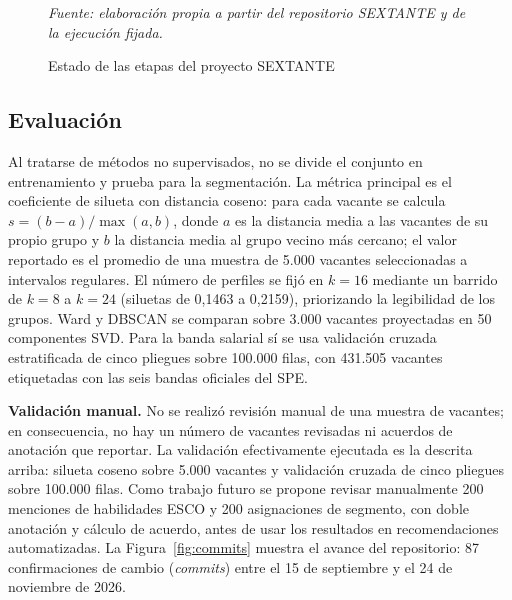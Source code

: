 \documentclass[journal]{IEEEtran}
\begin{document}
\begin{figure}[H]
\centering
{}
\caption{Estado de las etapas del proyecto SEXTANTE}
\label{fig:etapas}
\vspace{1pt}
{\footnotesize\textit{Fuente: elaboración propia a partir del repositorio SEXTANTE y de la ejecución fijada.}}
\end{figure}

\subsection{Evaluación}
Al tratarse de métodos no supervisados, no se divide el conjunto en entrenamiento y prueba para la segmentación. La métrica principal es el coeficiente de silueta con distancia coseno: para cada vacante se calcula $s=(b-a)/\max(a,b)$, donde $a$ es la distancia media a las vacantes de su propio grupo y $b$ la distancia media al grupo vecino más cercano; el valor reportado es el promedio de una muestra de 5.000 vacantes seleccionadas a intervalos regulares. El número de perfiles se fijó en $k=16$ mediante un barrido de $k=8$ a $k=24$ (siluetas de 0,1463 a 0,2159), priorizando la legibilidad de los grupos. Ward y DBSCAN se comparan sobre 3.000 vacantes proyectadas en 50 componentes SVD. Para la banda salarial sí se usa validación cruzada estratificada de cinco pliegues sobre 100.000 filas, con 431.505 vacantes etiquetadas con las seis bandas oficiales del SPE.

\textbf{Validación manual.} No se realizó revisión manual de una muestra de vacantes; en consecuencia, no hay un número de vacantes revisadas ni acuerdos de anotación que reportar. La validación efectivamente ejecutada es la descrita arriba: silueta coseno sobre 5.000 vacantes y validación cruzada de cinco pliegues sobre 100.000 filas. Como trabajo futuro se propone revisar manualmente 200 menciones de habilidades ESCO y 200 asignaciones de segmento, con doble anotación y cálculo de acuerdo, antes de usar los resultados en recomendaciones automatizadas. La Figura~\ref{fig:commits} muestra el avance del repositorio: 87 confirmaciones de cambio (\textit{commits}) entre el 15 de septiembre y el 24 de noviembre de 2026.
\end{document}
